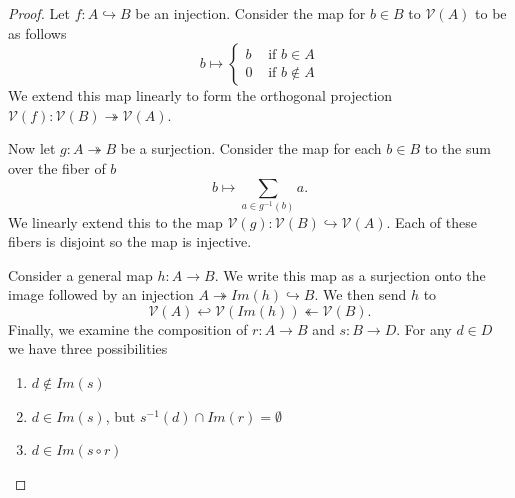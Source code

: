 \documentclass[12pt,a4paper]{article}
\theoremstyle{myrule}
\theoremstyle{postulate}
\theoremstyle{definition}
\begin{document}
\begin{proof}
  Let $f:A \hookrightarrow B$ be an injection. Consider the map for $b \in B$ to $\mathcal{V}(A)$ to be as follows
  \[
     b \mapsto \left\{ \begin{array}{cc} b & \text{ if } b \in A \\ 0 & \text{ if } b \not \in A  \end{array} \right.
\]
We extend this map linearly to form the orthogonal projection $\mathcal{V}(f):\mathcal{V}(B) \twoheadrightarrow \mathcal{V}(A)$.

Now let $g:A \twoheadrightarrow B$ be a surjection.  Consider the map for each $b \in B$ to the sum over the fiber of $b$
  \[
  b \mapsto \sum_{a \in g^{-1}(b)} a.
  \]
We linearly extend this to the map $\mathcal{V}(g):\mathcal{V}(B) \hookrightarrow  \mathcal{V}(A)$.  Each of these fibers is disjoint so the map is injective.

  Consider a general map $h:A \rightarrow B$.  We write this map as a surjection onto the image followed by an injection  $A \twoheadrightarrow Im(h) \hookrightarrow B$.  We then send $h$ to
 \[
 \mathcal{V}(A) \hookleftarrow \mathcal{V}(Im(h)) \twoheadleftarrow \mathcal{V}(B).
 \]
  Finally, we examine the composition of $r:A \rightarrow B$ and $s:B\rightarrow D$.  For any $d \in D$ we have three possibilities
  \begin{enumerate}
  \item $d \not \in Im(s)$
  \item $d \in Im(s)$, but $s^{-1}(d) \cap Im(r) = \emptyset$
  \item $d \in Im(s \circ r)$
  \end{enumerate}


\end{proof}
\end{document}
